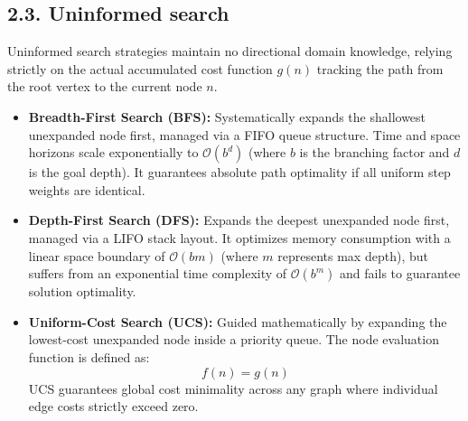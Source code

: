 \documentclass[../main.tex]{subfiles}
\begin{document}
\subsection{2.3. Uninformed search}
Uninformed search strategies maintain no directional domain knowledge, relying strictly on the actual accumulated cost function $g(n)$ tracking the path from the root vertex to the current node $n$.
\begin{itemize}
    \item \textbf{Breadth-First Search (BFS):} Systematically expands the shallowest unexpanded node first, managed via a FIFO queue structure. Time and space horizons scale exponentially to $\mathcal{O}(b^d)$ (where $b$ is the branching factor and $d$ is the goal depth). It guarantees absolute path optimality if all uniform step weights are identical.
    \item \textbf{Depth-First Search (DFS):} Expands the deepest unexpanded node first, managed via a LIFO stack layout. It optimizes memory consumption with a linear space boundary of $\mathcal{O}(bm)$ (where $m$ represents max depth), but suffers from an exponential time complexity of $\mathcal{O}(b^m)$ and fails to guarantee solution optimality.
    \item \textbf{Uniform-Cost Search (UCS):} Guided mathematically by expanding the lowest-cost unexpanded node inside a priority queue. The node evaluation function is defined as:
    \begin{equation}
        f(n) = g(n)
    \end{equation}
    UCS guarantees global cost minimality across any graph where individual edge costs strictly exceed zero.
\end{itemize}
\end{document}
